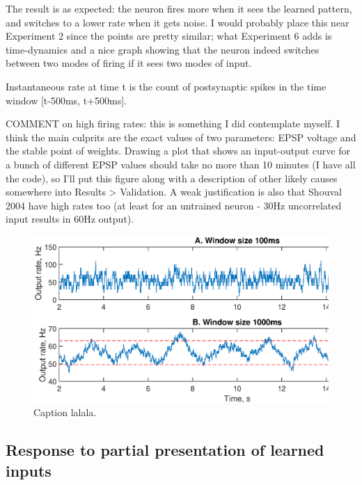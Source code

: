 \documentclass[a4paper,12pt]{report}
\theoremstyle{definition}
\begin{document}
The result is as expected: the neuron fires more when it sees the learned pattern, and switches to a lower rate when it gets noise.
I would probably place this near Experiment 2 since the points are pretty similar; what Experiment 6 adds is time-dynamics and a nice graph showing that the neuron indeed switches between two modes of firing if it sees two modes of input.

Instantaneous rate at time t is the count of postsynaptic spikes in the time window [t-500ms, t+500ms].

COMMENT on high firing rates: this is something I did contemplate myself. I think the main culprits are the exact values of two parameters: EPSP voltage and the stable point of weights. Drawing a plot that shows an input-output curve for a bunch of different EPSP values should take no more than 10 minutes (I have all the code), so I'll put this figure along with a description of other likely causes somewhere into Results > Validation. A weak justification is also that Shouval 2004 have high rates too (at least for an untrained neuron - 30Hz uncorrelated input results in 60Hz output).


\begin{figure}[h]
    \includegraphics[width=\textwidth]{figures/exp6_voltageoscillation.eps}
    \caption{Caption lalala.}
    \label{fig:exp6voltageoscillation}
\end{figure}







\clearpage %
\subsection{Response to partial presentation of learned inputs}
\label{subsec:partialpatterns}
\end{document}
